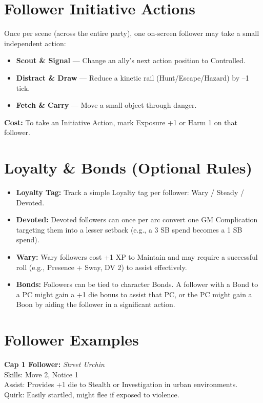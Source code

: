 \section{Follower Initiative Actions}

Once per scene (across the entire party), one on-screen follower may take a small independent action:

\begin{itemize}
  \item \textbf{Scout \& Signal} — Change an ally's next action position to Controlled.
  \item \textbf{Distract \& Draw} — Reduce a kinetic rail (Hunt/Escape/Hazard) by –1 tick.
  \item \textbf{Fetch \& Carry} — Move a small object through danger.
\end{itemize}

\textbf{Cost:} To take an Initiative Action, mark Exposure +1 or Harm 1 on that follower.

\section{Loyalty \& Bonds (Optional Rules)}

\begin{itemize}
  \item \textbf{Loyalty Tag:} Track a simple Loyalty tag per follower: Wary / Steady / Devoted.
  \item \textbf{Devoted:} Devoted followers can once per arc convert one GM Complication targeting them into a lesser setback (e.g., a 3 SB spend becomes a 1 SB spend).
  \item \textbf{Wary:} Wary followers cost +1 XP to Maintain and may require a successful roll (e.g., Presence + Sway, DV 2) to assist effectively.
  \item \textbf{Bonds:} Followers can be tied to character Bonds. A follower with a Bond to a PC might gain a +1 die bonus to assist that PC, or the PC might gain a Boon by aiding the follower in a significant action.
\end{itemize}

\section{Follower Examples}

\textbf{Cap 1 Follower:} \textit{Street Urchin} \\
Skills: Move 2, Notice 1 \\
Assist: Provides +1 die to Stealth or Investigation in urban environments. \\
Quirk: Easily startled, might flee if exposed to violence.

